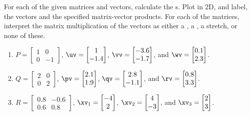 \begin{exercise} \label{ex:matvec2} 
For each of the given matrices and vectors, calculate the s.  
Plot in 2D, and label, the vectors and the specified matrix-vector products.
For each of the matrices, interpret the matrix multiplication of the vectors as either a , a , a stretch, or none of these.
\begin{enumerate}
\item \(P=\begin{bmatrix} 1&0\\0&-1 \end{bmatrix}\), 
\(\uv=\begin{bmatrix} 1\\-1.4 \end{bmatrix}\),
\(\vv=\begin{bmatrix} -3.6\\-1.7 \end{bmatrix}\), and
\(\wv=\begin{bmatrix} 0.1\\2.3 \end{bmatrix}\).


\item \(Q=\begin{bmatrix} 2&0\\0&2 \end{bmatrix}\), 
\(\pv=\begin{bmatrix} 2.1\\1.9 \end{bmatrix}\),
\(\qv=\begin{bmatrix} 2.8\\-1.1 \end{bmatrix}\), and
\(\rv=\begin{bmatrix} 0.8\\3.3 \end{bmatrix}\).


\item \(R=\begin{bmatrix} 0.8&-0.6
\\0.6& 0.8 \end{bmatrix}\), 
\(\xv_1=\begin{bmatrix} -4\\2 \end{bmatrix}\),
\(\xv_2=\begin{bmatrix} 4\\-3 \end{bmatrix}\), and
\(\xv_3=\begin{bmatrix} 2\\3 \end{bmatrix}\).



\end{enumerate}
\end{exercise}
